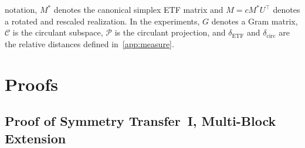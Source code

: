 \documentclass[11pt]{article}
\begin{document}
notation, \(M^*\) denotes the canonical simplex ETF matrix and \(M=cM^*U^\top\) denotes a rotated and rescaled realization. In the experiments, \(G\) denotes a Gram matrix, \(\mathcal C\) is the circulant subspace, \(\mathcal P\) is the circulant projection, and \(\delta_{\mathrm{ETF}}\) and \(\delta_{\mathrm{circ}}\) are the relative distances defined in~\cref{app:measure}.

\section{Proofs}
\subsection{Proof of Symmetry Transfer~I, Multi-Block Extension}
\label{pf:multi_block_cyclic}
\end{document}
